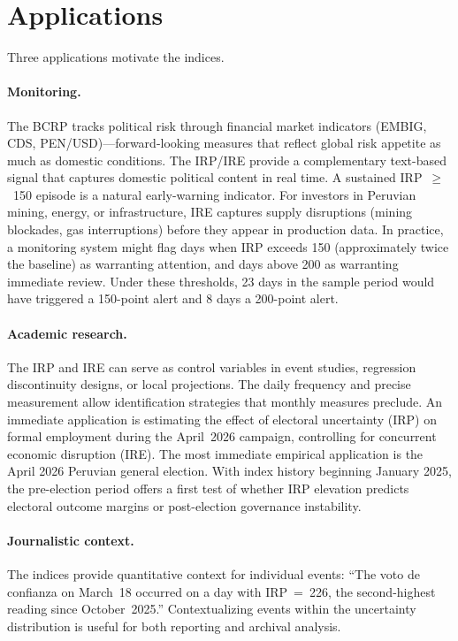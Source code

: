 \documentclass[12pt,a4paper]{article}
\begin{document}
\section{Applications}
\label{sec:applications}

Three applications motivate the indices.

\paragraph{Monitoring.}
The BCRP tracks political risk through financial market indicators (EMBIG,
CDS, PEN/USD)---forward-looking measures that reflect global risk appetite
as much as domestic conditions.  The IRP/IRE provide a complementary
text-based signal that captures domestic political content in real time.
A sustained IRP~$\geq$~150 episode is a natural early-warning indicator.
For investors in Peruvian mining, energy, or infrastructure, IRE captures
supply disruptions (mining blockades, gas interruptions) before they appear
in production data.  In practice, a monitoring system might flag days when
IRP exceeds 150 (approximately twice the baseline) as warranting attention,
and days above 200 as warranting immediate review.  Under these thresholds,
23 days in the sample period would have triggered a 150-point alert and
8 days a 200-point alert.

\paragraph{Academic research.}
The IRP and IRE can serve as control variables in event studies, regression
discontinuity designs, or local projections.  The daily frequency and
precise measurement allow identification strategies that monthly measures
preclude.  An immediate application is estimating the effect of electoral
uncertainty (IRP) on formal employment during the April~2026 campaign,
controlling for concurrent economic disruption (IRE).  The most immediate
empirical application is the April 2026 Peruvian general election.  With
index history beginning January 2025, the pre-election period offers a
first test of whether IRP elevation predicts electoral outcome margins or
post-election governance instability.

\paragraph{Journalistic context.}
The indices provide quantitative context for individual events:
``The voto de confianza on March~18 occurred on a day with IRP~=~226, the
second-highest reading since October~2025.''  Contextualizing events within
the uncertainty distribution is useful for both reporting and archival
analysis.
\end{document}

